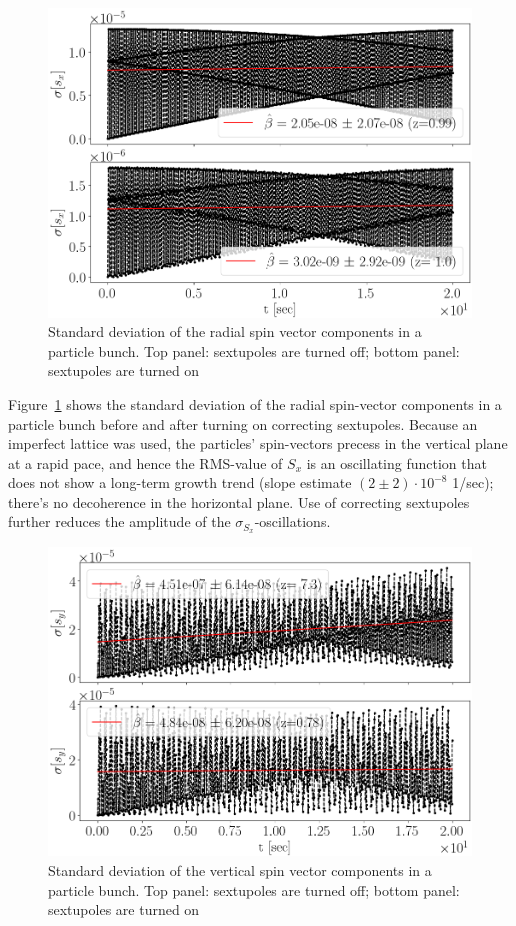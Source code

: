 \documentclass[a4paper]{jacow}
\begin{document}
\begin{figure}[ht]
  \centering
  \includegraphics[width=\linewidth]{../img/IPAC19/SX_decoh_20sec_both}
  \caption{Standard deviation of the radial spin vector components in a particle bunch.
    Top panel: sextupoles are turned off; bottom panel: sextupoles are turned on\label{fig:decoh_rms_sx}}
\end{figure}

Figure~\ref{fig:decoh_rms_sx} shows the standard deviation of the radial spin-vector components in a particle bunch before and after turning on correcting sextupoles. Because an imperfect lattice was used, the particles' spin-vectors precess in the vertical plane at a rapid pace, and hence the RMS-value of $S_x$ is an oscillating function that does not show a long-term growth trend (slope estimate $(2 \pm 2)\cdot 10^{-8}$ 1/sec); there's no decoherence in the horizontal plane. Use of correcting sextupoles further reduces the amplitude of the $\sigma_{S_x}$-oscillations.

\begin{figure}[ht]
  \centering
  \includegraphics[width=\linewidth]{../img/IPAC19/SY_decoh_20sec_both}
  \caption{Standard deviation of the vertical spin vector components in a particle bunch.
    Top panel: sextupoles are turned off; bottom panel: sextupoles are turned on\label{fig:decoh_rms_sy}}
\end{figure}
\end{document}
